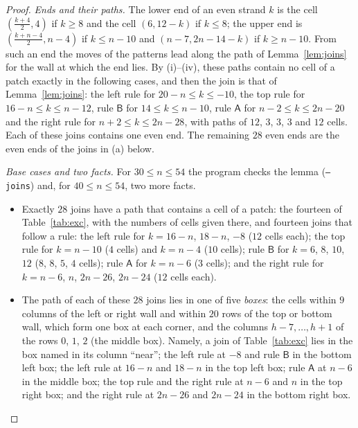 \documentclass[11pt]{amsart}
\theoremstyle{remark}
\begin{document}
\begin{proof}
\emph{Ends and their paths.} The lower end of an even strand $k$ is the cell $(\frac{k+4}2,4)$ if $k\ge8$ and the cell
$(6,12-k)$ if $k\le8$; the upper end is $(\frac{k+n-4}2,n-4)$ if $k\le n-10$ and $(n-7,2n-14-k)$ if $k\ge n-10$. From such
an end the moves of the patterns lead along the path of Lemma~\ref{lem:joins} for the wall at which the end lies. By
(i)--(iv), these paths contain no cell of a patch exactly in the following cases, and then the join is that of
Lemma~\ref{lem:joins}: the left rule for $20-n\le k\le-10$, the top rule for $16-n\le k\le n-12$, rule $\mathsf B$ for
$14\le k\le n-10$, rule $\mathsf A$ for $n-2\le k\le 2n-20$ and the right rule for $n+2\le k\le 2n-28$, with paths of $12$,
$3$, $3$, $3$ and $12$ cells. Each of these joins contains one even end. The remaining $28$ even ends are the even ends of the
joins in (a) below.

\emph{Base cases and two facts.} For $30\le n\le54$ the program checks the lemma (\texttt{--joins}) and, for
$40\le n\le54$, two more facts.
\begin{itemize}
\item[(a)] Exactly $28$ joins have a path that contains a cell of a patch: the fourteen of Table~\ref{tab:exc}, with the
numbers of cells given there, and fourteen joins that follow a rule: the left rule for $k=16-n$, $18-n$, $-8$ ($12$ cells
each); the top rule for $k=n-10$ ($4$ cells) and $k=n-4$ ($10$ cells); rule $\mathsf B$ for $k=6$, $8$, $10$, $12$ ($8$,
$8$, $5$, $4$ cells); rule $\mathsf A$ for $k=n-6$ ($3$ cells); and the right rule for $k=n-6$, $n$, $2n-26$, $2n-24$
($12$ cells each).
\item[(b)] The path of each of these $28$ joins lies in one of five \emph{boxes}: the cells within $9$ columns of the left or
right wall and within $20$ rows of the top or bottom wall, which form one box at each corner, and the columns
$h-7,\dots,h+1$ of the rows $0$, $1$, $2$ (the middle box). Namely, a join of Table~\ref{tab:exc} lies in the box named in
its column ``near''; the left rule at $-8$ and rule $\mathsf B$ in the bottom left box; the left rule at $16-n$ and $18-n$ in
the top left box; rule $\mathsf A$ at $n-6$ in the middle box; the top rule and the right rule at $n-6$ and $n$ in the top
right box; and the right rule at $2n-26$ and $2n-24$ in the bottom right box.
\end{itemize}


\end{proof}
\end{document}
